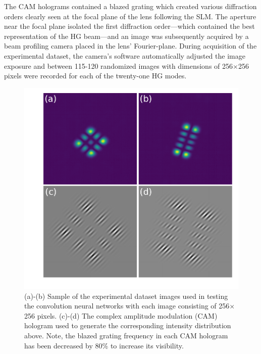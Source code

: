 \documentclass[10pt,journal,compsoc]{IEEEtran}
\begin{document}
The CAM holograms \cite{slmbook} contained a blazed grating which created various diffraction orders clearly seen at the focal plane of the lens following the SLM. The aperture near the focal plane isolated the first diffraction order---which contained the best representation of the HG beam---and an image was subsequently acquired by a beam profiling camera placed in the lens' Fourier-plane. During acquisition of the experimental dataset, the camera's software automatically adjusted the image exposure and between 115-120 randomized images with dimensions of 256$\times$256 pixels were recorded for each of the twenty-one HG modes. 

\begin{figure}%
\centering %
\includegraphics[width=.45\textwidth]{experimental_modes.pdf} %
\caption[Table of Contents Figure Caption]{(a)-(b) Sample of the experimental dataset images used in testing the convolution neural networks with each image consisting of 256$\times$256 pixels. (c)-(d) The complex amplitude modulation (CAM) hologram used to generate the corresponding intensity distribution above. Note, the blazed grating frequency in each CAM hologram has been decreased by 80\% to increase its visibility.} %
\label{fig:exp_holo} %
\end{figure}

\end{document}
